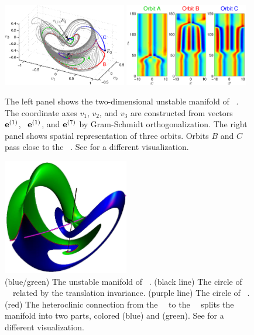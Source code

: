 \begin{figure}[h]
\begin{center}
\includegraphics[width=0.48\textwidth]{figs/ks22_E2_manifold_c.eps}%
\includegraphics[width=0.48\textwidth]{figs/ks22_E2_orbits_c.eps}
\end{center}
\caption{
The left panel shows the two-dimensional
unstable manifold of \eqv\ . The coordinate axes
$v_1$, $v_2$, and $v_3$ are constructed from vectors
\Re\, ${\mathbf e}^{(1)}$, \Im\, ${\mathbf e}^{(1)}$, and ${\mathbf e}^{(7)}$
by Gram-Schmidt orthogonalization.
The right panel shows spatial representation of three orbits. Orbits
$B$ and $C$ pass close to the \eqv\ . See
 for a different visualization.
       }
\label{f:KS22E2man}
\end{figure}


\begin{figure}[t]
\begin{center}
\includegraphics[height=2in]{figs/ks22manifold1.eps}
\end{center}
\caption{
    (blue/green) The unstable manifold of ~\eqv.
    (black line) The circle of ~\eqva\
related by the translation invariance.
(purple line) The circle  of ~\eqva.
(red) The heteroclinic connection
from the ~\eqv\ to the ~\eqv\ splits
the manifold into two parts,
colored (blue) and (green).  See
 for a different visualization.
        }
\label{f:KS22Manifold}
\end{figure}

